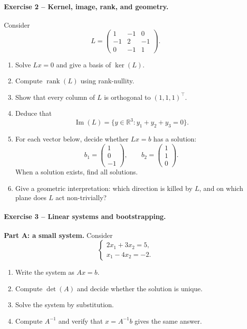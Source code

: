 \documentclass[10pt]{article}
\newcommand{\R}{\mathbb{R}}
\newcommand{\rank}{\operatorname{rank}}
\newcommand{\im}{\operatorname{Im}}
\begin{document}
\paragraph{Exercise 2 -- Kernel, image, rank, and geometry.}
Consider
\[
L=
\begin{pmatrix}
1&-1&0\\
-1&2&-1\\
0&-1&1
\end{pmatrix}.
\]

\begin{enumerate}
\item Solve $Lx=0$ and give a basis of $\ker(L)$.
\item Compute $\rank(L)$ using rank-nullity.
\item Show that every column of $L$ is orthogonal to $(1,1,1)^\top$.
\item Deduce that
\[
\im(L)=\{y\in\R^3:y_1+y_2+y_3=0\}.
\]
\item For each vector below, decide whether $Lx=b$ has a solution:
\[
b_1=\begin{pmatrix}1\\0\\-1\end{pmatrix},\qquad
b_2=\begin{pmatrix}1\\1\\0\end{pmatrix}.
\]
When a solution exists, find all solutions.
\item Give a geometric interpretation: which direction is killed by $L$, and
on which plane does $L$ act non-trivially?
\end{enumerate}

\paragraph{Exercise 3 -- Linear systems and bootstrapping.}

\textbf{Part A: a small system.}
Consider
\[
\begin{cases}
2x_1+3x_2=5,\\
x_1-4x_2=-2.
\end{cases}
\]
\begin{enumerate}
\item Write the system as $Ax=b$.
\item Compute $\det(A)$ and decide whether the solution is unique.
\item Solve the system by substitution.
\item Compute $A^{-1}$ and verify that $x=A^{-1}b$ gives the same answer.
\end{enumerate}
\end{document}
